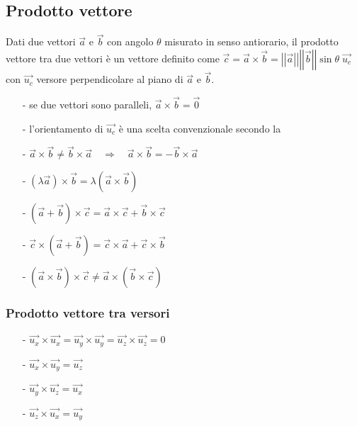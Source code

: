 \documentclass[a4paper]{article}
\newcommand\vmod[1]{\left|\left|{#1}\right|\right|}
\begin{document}
\subsection{Prodotto vettore}
Dati due vettori \(\vec{a}\) e \(\vec{b}\) con angolo \(\theta\) misurato in senso antiorario, il prodotto vettore tra due vettori
è un vettore definito come \(\vec{c} = \vec{a} \times \vec{b} = \vmod{\vec{a}} \vmod{\vec{b}} \sin \theta \; \vec{u_c}\)
con \(\vec{u_c}\) versore perpendicolare al piano di \(\vec{a}\) e \(\vec{b}\).
\begin{itemize}[topsep=3pt, itemsep=0pt]
	\item[-] se due vettori sono paralleli, \(\vec{a} \times \vec{b} = \vec{0}\)
	\item[-] l'orientamento di \(\vec{u_c}\) è una scelta convenzionale secondo la 
	\item[-] \(\vec{a} \times \vec{b} \neq \vec{b} \times \vec{a} \quad \Rightarrow \quad \vec{a} \times \vec{b} = - \vec{b} \times \vec{a}\)
	\item[-] \((\lambda \vec{a}) \times \vec{b} = \lambda (\vec{a} \times \vec{b})\)
	\item[-] \((\vec{a} + \vec{b}) \times \vec{c} = \vec{a} \times \vec{c} + \vec{b} \times \vec{c}\)
	\item[-] \(\vec{c} \times (\vec{a} + \vec{b}) = \vec{c} \times \vec{a} + \vec{c} \times \vec{b}\)
	\item[-] \((\vec{a} \times \vec{b}) \times \vec{c} \neq \vec{a} \times (\vec{b} \times \vec{c})\)
\end{itemize}

\subsubsection*{Prodotto vettore tra versori}
\begin{itemize}[topsep=3pt, itemsep=0pt]
	\item[-] \(\vec{u_x} \times \vec{u_x} = \vec{u_y} \times \vec{u_y} = \vec{u_z} \times \vec{u_z} = 0\)
	\item[-] \(\vec{u_x} \times \vec{u_y} = \vec{u_z}\)
	\item[-] \(\vec{u_y} \times \vec{u_z} = \vec{u_x}\)
	\item[-] \(\vec{u_z} \times \vec{u_x} = \vec{u_y}\)
\end{itemize}
\end{document}
